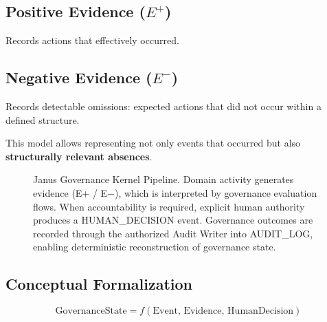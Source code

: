 \documentclass[conference]{IEEEtran}
\begin{document}
\subsection{Positive Evidence ($E^{+}$)}
Records actions that effectively occurred.

\subsection{Negative Evidence ($E^{-}$)}
Records detectable omissions: expected actions that did not occur within a defined structure.

This model allows representing not only events that occurred but also \textbf{structurally relevant absences}.

\begin{figure}[ht]
\centering
{}
\caption{Janus Governance Kernel Pipeline. Domain activity generates evidence (E+ / E−), which is interpreted by governance evaluation flows. When accountability is required, explicit human authority produces a HUMAN\_DECISION event. Governance outcomes are recorded through the authorized Audit Writer into AUDIT\_LOG, enabling deterministic reconstruction of governance state.}
\label{fig:janus_pipeline}
\end{figure}

\subsection{Conceptual Formalization}
\begin{equation}
\mathrm{GovernanceState} = f(\mathrm{Event},\, \mathrm{Evidence},\, \mathrm{HumanDecision})
\end{equation}
\end{document}
